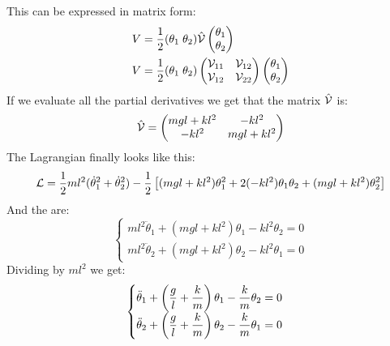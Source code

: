 This can be expressed in matrix form:
\begin{equation}
    \begin{split}
        V &= \dfrac{1}{2}(\theta_1\;\theta_2)\hat{\mathcal{V}}\begin{pmatrix}
            \theta_1 \\
            \theta_2
        \end{pmatrix}\\
        V &= \dfrac{1}{2}(\theta_1\;\theta_2)\begin{pmatrix}
            \mathcal{V}_{11} & \mathcal{V}_{12}\\
            \mathcal{V}_{12} & \mathcal{V}_{22}
        \end{pmatrix} \begin{pmatrix}
            \theta_1 \\
            \theta_2
        \end{pmatrix}
    \end{split}
\end{equation}
If we evaluate all the partial derivatives we get that the matrix $\hat{\mathcal{V}}$ is:
\begin{equation}
    \hat{\mathcal{V}} = \begin{pmatrix}
        mgl+kl^2 & -kl^2\\
        -kl^2 & mgl+kl^2
    \end{pmatrix}
\end{equation}
The Lagrangian finally looks like this:
\begin{equation}
    \mathcal{L} = \dfrac{1}{2}ml^2(\dot{\theta}_1^2+\dot{\theta}_2^2) - \dfrac{1}{2}\left[(mgl+kl^2)\theta_1^2 + 2(-kl^2)\theta_1\theta_2 + (mgl+kl^2)\theta_2^2 \right]
\end{equation}
And the \eleref\;are:
\begin{equation}
    \begin{cases}
        ml^2\ddot{\theta}_1 + (mgl + kl^2)\theta_1 - kl^2\theta_2 = 0\\
        ml^2\ddot{\theta}_2 + (mgl + kl^2)\theta_2 - kl^2\theta_1 = 0
    \end{cases}
\end{equation}
Dividing by $ml^2$ we get:
\begin{equation} \label{e:ode_system_double_pendulum}
    \begin{cases}
        \ddot{\theta}_1 + \left(\dfrac{g}{l} + \dfrac{k}{m}\right)\theta_1 - \dfrac{k}{m}\theta_2 = 0\\
        \ddot{\theta}_2 + \left(\dfrac{g}{l} + \dfrac{k}{m}\right)\theta_2 - \dfrac{k}{m}\theta_1 = 0
    \end{cases}
\end{equation}
